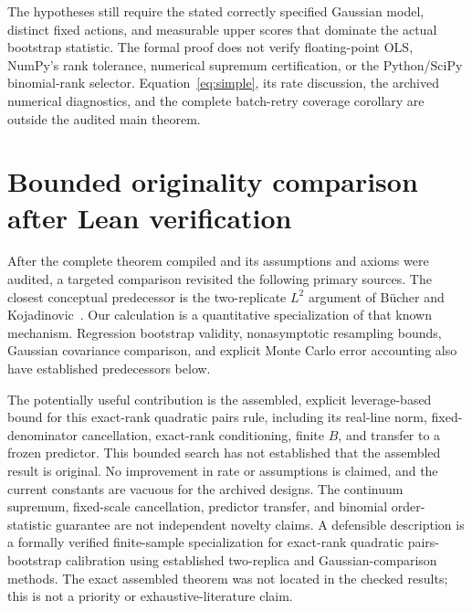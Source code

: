 \documentclass[11pt]{article}
\begin{document}
The hypotheses still require the stated correctly specified Gaussian model,
distinct fixed actions, and measurable upper scores that dominate the actual
bootstrap statistic. The formal proof does not verify floating-point OLS,
NumPy's rank tolerance, numerical supremum certification, or the Python/SciPy
binomial-rank selector. Equation~\eqref{eq:simple}, its rate discussion, the
archived numerical diagnostics, and the complete batch-retry coverage
corollary are outside the audited main theorem.

\section{Bounded originality comparison after Lean verification}

After the complete theorem compiled and its assumptions and axioms were
audited, a targeted comparison revisited the following primary sources.
The closest conceptual predecessor is the two-replicate $L^2$ argument of
B\"ucher and Kojadinovic~\cite{bk}. Our calculation is a quantitative
specialization of that known mechanism. Regression bootstrap validity,
nonasymptotic resampling bounds, Gaussian covariance comparison, and explicit
Monte Carlo error accounting also have established predecessors below.

The potentially useful contribution is the assembled, explicit leverage-based
bound for this exact-rank quadratic pairs rule, including its real-line norm,
fixed-denominator cancellation, exact-rank conditioning, finite $B$, and transfer to
a frozen predictor. This bounded search has not established that the assembled
result is original. No improvement in rate or assumptions is claimed, and the
current constants are vacuous for the archived designs. The continuum
supremum, fixed-scale cancellation, predictor transfer, and binomial
order-statistic guarantee are not independent novelty claims. A defensible
description is a formally verified finite-sample specialization for exact-rank
quadratic pairs-bootstrap calibration using established two-replica and
Gaussian-comparison methods. The exact assembled theorem was not located in
the checked results; this is not a priority or exhaustive-literature claim.
\end{document}
